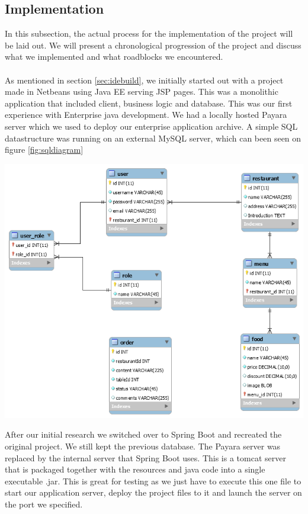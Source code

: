 \documentclass[12pt]{article}
\newenvironment{Figure}
	{\par\medskip\noindent\minipage{\linewidth}}
	{\endminipage\par\medskip}
\begin{document}
\begin{multicols}{2}
\subsection{Implementation}\label{sec:implementation}
In this subsection, the actual process for the implementation of the project will be laid out. We will present a chronological progression of the project and discuss what we implemented and what roadblocks we encountered.
\\\\
As mentioned in section \ref{sec:idebuild}, we initially started out with a project made in Netbeans using Java EE serving JSP pages. This was a monolithic application that included client, business logic and database. This was our first experience with Enterprise java development. We had a locally hosted Payara server which we used to deploy our enterprise application archive. A simple SQL datastructure was running on an external MySQL server, which can been seen on figure \ref{fig:sqldiagram}
\begin{Figure}
	\centering
	\includegraphics[width=\linewidth]{illustrations/database.png}
	\label{fig:sqldiagram}
\end{Figure}
\noindent After our initial research we switched over to Spring Boot and recreated the original project. We still kept the previous database. The Payara server was replaced by the internal server that Spring Boot uses. This is a tomcat server that is packaged together with the resources and java code into a single executable .jar. This is great for testing as we just have to execute this one file to start our application server, deploy the project files to it and launch the server on the port we specified.

\end{multicols}
\end{document}
